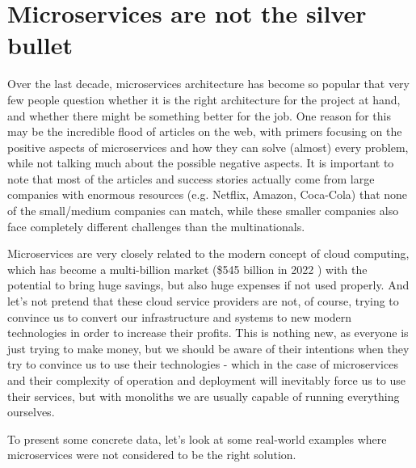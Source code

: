 \section{Microservices are not the silver bullet}
Over the last decade, microservices architecture has become so popular that very few people question whether it is the right architecture for the project at hand, and whether there might be something better for the job. One reason for this may be the incredible flood of articles on the web, with primers focusing on the positive aspects of microservices and how they can solve (almost) every problem, while not talking much about the possible negative aspects. It is important to note that most of the articles and success stories actually come from large companies with enormous resources (e.g. Netflix, Amazon, Coca-Cola) that none of the small/medium companies can match, while these smaller companies also face completely different challenges than the multinationals.

Microservices are very closely related to the modern concept of cloud computing, which has become a multi-billion market (\$545 billion in 2022 \cite{CC_MARKET_SIZE}) with the potential to bring huge savings, but also huge expenses if not used properly. And let's not pretend that these cloud service providers are not, of course, trying to convince us to convert our infrastructure and systems to new modern technologies in order to increase their profits. This is nothing new, as everyone is just trying to make money, but we should be aware of their intentions when they try to convince us to use their technologies - which in the case of microservices and their complexity of operation and deployment will inevitably force us to use their services, but with monoliths we are usually capable of running everything ourselves.

To present some concrete data, let's look at some real-world examples where microservices were not considered to be the right solution.

